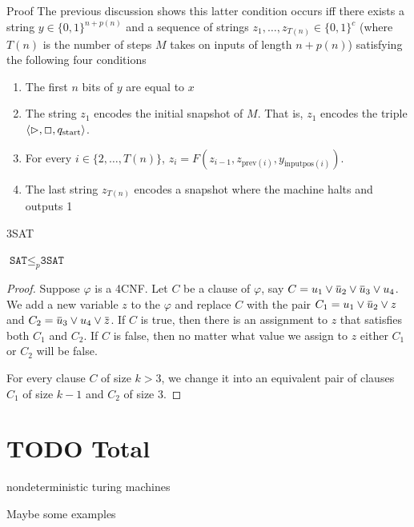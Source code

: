 \documentclass[presentation]{beamer}
\def \start {\text{start}}
\def \SAT {\texttt{SAT}}
\def \TSAT {\texttt{3SAT}}
\begin{document}
\begin{frame}[label={sec:org5d09d05}]{Proof}
The previous discussion shows this latter condition occurs iff
 there exists a string \(y\in\{0,1\}^{n+p(n)}\) and a sequence of strings
 \(z_1,\dots,z_{T(n)}\in\{0,1\}^c\) (where \(T(n)\) is the number of steps \(M\) takes on inputs
 of length \(n+p(n)\)) satisfying the following four conditions
\begin{enumerate}
\item The first \(n\) bits of \(y\) are equal to \(x\)
\item The string \(z_1\) encodes the initial snapshot of \(M\). That is, \(z_1\) encodes the
triple \(\la\rhd,\Box,q_{\start}\ra\).
\item For every \(i\in\{2,\dots,T(n)\}\), \(z_i=F(z_{i-1},z_{\text{prev}(i)},y_{\text{inputpos}(i)})\).
\item The last string \(z_{T(n)}\) encodes a snapshot where the machine halts and outputs 1
\end{enumerate}
\end{frame}
\begin{frame}[label={sec:org7961583}]{3SAT}
\begin{lemma}[]
\(\SAT\le_p\TSAT\)
\end{lemma}

\begin{proof}
Suppose \(\varphi\) is a 4CNF. Let \(C\) be a clause of \(\varphi\), say \(C=u_1\vee\baru_2\vee\baru_3\vee u_4\).
We add a new variable \(z\) to the \(\varphi\) and replace \(C\) with the pair
\(C_1=u_1\vee\baru_2\vee z\) and \(C_2=\baru_3\vee u_4\vee\barz\). If \(C\) is true, then there
is an assignment to \(z\) that satisfies both \(C_1\) and \(C_2\). If \(C\) is false, then no
matter what value we assign to \(z\) either \(C_1\) or \(C_2\) will be false.

For every clause \(C\) of size \(k>3\), we change it into an equivalent pair of clauses \(C_1\)
of size \(k-1\) and \(C_2\) of size 3.
\end{proof}
\end{frame}


\section{{\bfseries\sffamily TODO} Total}
\label{sec:org1e716c3}

nondeterministic turing machines

Maybe some examples
\end{document}
